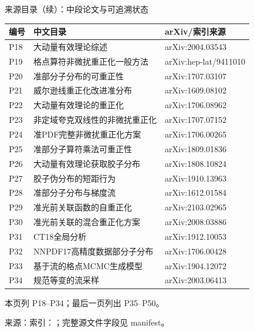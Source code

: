 \documentclass[UTF8,aspectratio=169,11pt]{ctexbeamer}
\newcommand{\source}[1]{\vspace{0.08em}\par{\raggedright\scriptsize\color{muted}来源：#1\par}}
\begin{document}
\begin{frame}[t]{来源目录（续）：中段论文与可追溯状态}
  \scriptsize
  \begin{tabularx}{0.98\linewidth}{@{}lXl@{}}
    \toprule
    编号 & 中文目录 & arXiv/索引来源 \\
    \midrule
    P18 & 大动量有效理论综述 & arXiv:2004.03543 \\
    P19 & 格点算符非微扰重正化一般方法 & arXiv:hep-lat/9411010 \\
    P20 & 准部分子分布的可重正性 & arXiv:1707.03107 \\
    P21 & 威尔逊线重正化改进准分布 & arXiv:1609.08102 \\
    P22 & 大动量有效理论的重正化 & arXiv:1706.08962 \\
    P23 & 非定域夸克双线性的非微扰重正化 & arXiv:1707.07152 \\
    P24 & 准PDF完整非微扰重正化方案 & arXiv:1706.00265 \\
    P25 & 准部分子算符乘法可重正性 & arXiv:1809.01836 \\
    P26 & 大动量有效理论获取胶子分布 & arXiv:1808.10824 \\
    P27 & 胶子伪分布的短距行为 & arXiv:1910.13963 \\
    P28 & 准部分子分布与梯度流 & arXiv:1612.01584 \\
    P29 & 准光前关联函数的自重正化 & arXiv:2103.02965 \\
    P30 & 准光前关联的混合重正化方案 & arXiv:2008.03886 \\
    P31 & CT18全局分析 & arXiv:1912.10053 \\
    P32 & NNPDF17高精度数据部分子分布 & arXiv:1706.00428 \\
    P33 & 基于流的格点MCMC生成模型 & arXiv:1904.12072 \\
    P34 & 规范等变的流采样 & arXiv:2003.06413 \\
    \bottomrule
  \end{tabularx}
  \vspace{0.2em}
  \scriptsize 本页列 P18–P34；最后一页列出 P35–P50。
  \source{索引：；完整源文件字段见 manifest。}
\end{frame}
\end{document}
